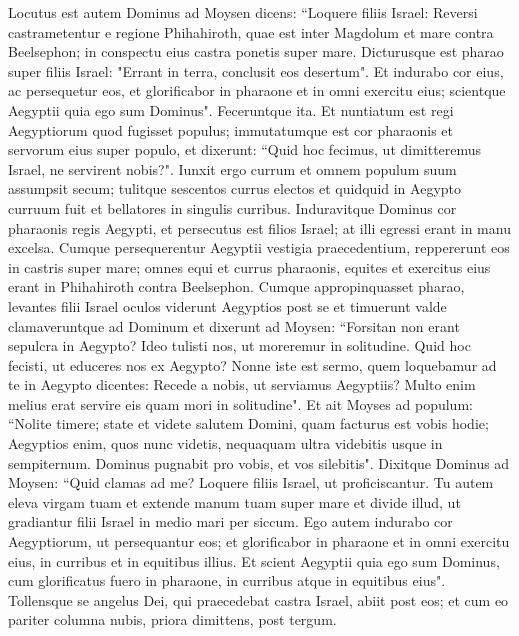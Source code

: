 \begin{biblechapter}  
\verse Locutus est autem Dominus ad Moysen dicens: 
\verse “Loquere filiis Israel: Reversi castrametentur e regione Phihahiroth, quae est inter Magdolum et mare contra Beelsephon; in conspectu eius castra ponetis super mare. 
\verse Dicturusque est pharao super filiis Israel: "Errant in terra, conclusit eos desertum". 
\verse Et indurabo cor eius, ac persequetur eos, et glorificabor in pharaone et in omni exercitu eius; scientque Aegyptii quia ego sum Dominus". Feceruntque ita. 
\verse Et nuntiatum est regi Aegyptiorum quod fugisset populus; immutatumque est cor pharaonis et servorum eius super populo, et dixerunt: “Quid hoc fecimus, ut dimitteremus Israel, ne servirent nobis?". 
\verse Iunxit ergo currum et omnem populum suum assumpsit secum; 
\verse tulitque sescentos currus electos et quidquid in Aegypto curruum fuit et bellatores in singulis curribus. 
\verse Induravitque Dominus cor pharaonis regis Aegypti, et persecutus est filios Israel; at illi egressi erant in manu excelsa. 
\verse Cumque persequerentur Aegyptii vestigia praecedentium, reppererunt eos in castris super mare; omnes equi et currus pharaonis, equites et exercitus eius erant in Phihahiroth contra Beelsephon. 
\verse Cumque appropinquasset pharao, levantes filii Israel oculos viderunt Aegyptios post se et timuerunt valde clamaveruntque ad Dominum 
\verse et dixerunt ad Moysen: “Forsitan non erant sepulcra in Aegypto? Ideo tulisti nos, ut moreremur in solitudine. Quid hoc fecisti, ut educeres nos ex Aegypto? 
\verse Nonne iste est sermo, quem loquebamur ad te in Aegypto dicentes: Recede a nobis, ut serviamus Aegyptiis? Multo enim melius erat servire eis quam mori in solitudine". 
\verse Et ait Moyses ad populum: “Nolite timere; state et videte salutem Domini, quam facturus est vobis hodie; Aegyptios enim, quos nunc videtis, nequaquam ultra videbitis usque in sempiternum. 
\verse Dominus pugnabit pro vobis, et vos silebitis". 
\verse Dixitque Dominus ad Moysen: “Quid clamas ad me? Loquere filiis Israel, ut proficiscantur. 
\verse Tu autem eleva virgam tuam et extende manum tuam super mare et divide illud, ut gradiantur filii Israel in medio mari per siccum.  
\verse Ego autem indurabo cor Aegyptiorum, ut persequantur eos; et glorificabor in pharaone et in omni exercitu eius, in curribus et in equitibus illius. 
\verse Et scient Aegyptii quia ego sum Dominus, cum glorificatus fuero in pharaone, in curribus atque in equitibus eius". 
\verse Tollensque se angelus Dei, qui praecedebat castra Israel, abiit post eos; et cum eo pariter columna nubis, priora dimittens, post tergum. 

\end{biblechapter}
